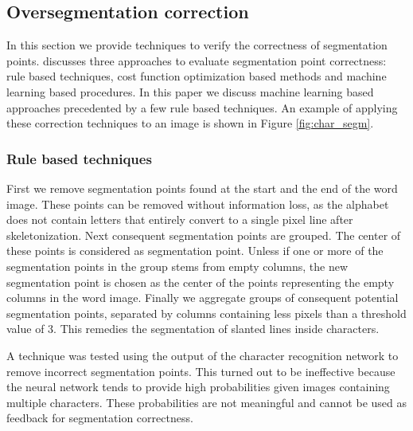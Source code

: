 \documentclass{article}
\begin{document}
\subsection{Oversegmentation correction}
\label{sec:postprocesscharseg}

In this section we provide techniques to verify the correctness of segmentation points.
\cite{evalsplitpoints} discusses three approaches to evaluate segmentation point correctness: rule based techniques, cost function optimization based methods and machine learning based procedures.
In this paper we discuss machine learning based approaches precedented by a few rule based techniques.
An example of applying these correction techniques to an image is shown in Figure \ref{fig:char_segm}.

\subsubsection{Rule based techniques}

First we remove segmentation points found at the start and the end of the word image.
These points can be removed without information loss, as the alphabet does not contain letters that entirely convert to a single pixel line after skeletonization.
Next consequent segmentation points are grouped. The center of these points is considered as segmentation point.
Unless if one or more of the segmentation points in the group stems from empty columns, the new segmentation point is chosen as the center of the points representing the empty columns in the word image.
Finally we aggregate groups of consequent potential segmentation points, separated by columns containing less pixels than a threshold value of 3.
This remedies the segmentation of slanted lines inside characters.

A technique was tested using the output of the character recognition network to remove incorrect segmentation points.
This turned out to be ineffective because the neural network tends to provide high probabilities given images containing multiple characters. These probabilities are not meaningful and cannot be used as feedback for segmentation correctness. 
\end{document}
